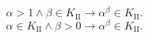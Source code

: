 $$\alpha > 1 \land \beta \in K_{\mathrm{II}} \rightarrow \alpha^\beta \in K_{\mathrm{II}}.$$
$$\alpha \in K_{\mathrm{II}} \land \beta > 0 \rightarrow \alpha^\beta \in K_{\mathrm{II}}.$$
